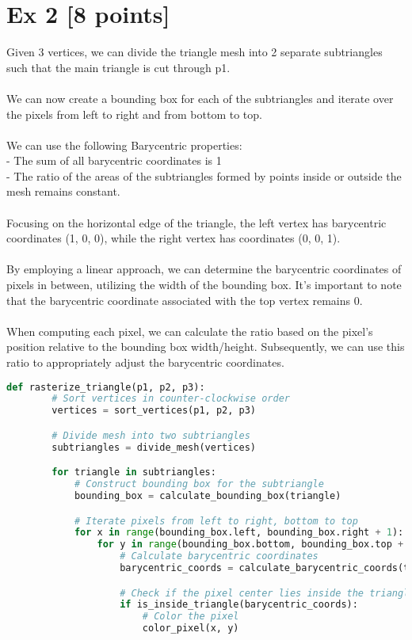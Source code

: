 \documentclass{article}
\begin{document}
\section*{Ex 2 [8 points]}


Given 3 vertices, we can divide the triangle mesh into 2 separate subtriangles such that the main triangle is cut through p1.\\\\
We can now create a bounding box for each of the subtriangles and iterate over the pixels from left to right and from bottom to top.\\\\
We can use the following Barycentric properties: \\
- The sum of all barycentric coordinates is 1\\
- The ratio of the areas of the subtriangles formed by points inside or outside the mesh remains constant.
\\\\
Focusing on the horizontal edge of the triangle, the left vertex has barycentric coordinates (1, 0, 0), while the right vertex has coordinates (0, 0, 1). \\\\
By employing a linear approach, we can determine the barycentric coordinates of pixels in between, utilizing the width of the bounding box.
It's important to note that the barycentric coordinate associated with the top vertex remains 0. \\\\
When computing each pixel, we can calculate the ratio based on the pixel's position relative to the bounding box width/height. Subsequently, we can use this ratio to appropriately adjust the barycentric coordinates. \\

\begin{lstlisting}[language=Python]
    def rasterize_triangle(p1, p2, p3):
        # Sort vertices in counter-clockwise order
        vertices = sort_vertices(p1, p2, p3)

        # Divide mesh into two subtriangles
        subtriangles = divide_mesh(vertices)

        for triangle in subtriangles:
            # Construct bounding box for the subtriangle
            bounding_box = calculate_bounding_box(triangle)

            # Iterate pixels from left to right, bottom to top
            for x in range(bounding_box.left, bounding_box.right + 1):
                for y in range(bounding_box.bottom, bounding_box.top + 1):
                    # Calculate barycentric coordinates
                    barycentric_coords = calculate_barycentric_coords(triangle, x, y)

                    # Check if the pixel center lies inside the triangle
                    if is_inside_triangle(barycentric_coords):
                        # Color the pixel
                        color_pixel(x, y)
\end{lstlisting}
\end{document}
